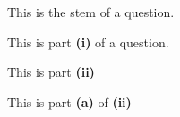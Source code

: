 

\begin{question}
    This is the stem of a question.

    \begin{questionparts}
        \item This is part \textbf{(i)} of a question. 
        \item This is part \textbf{(ii)} 
        \begin{questionsubparts}
            \item This is part \textbf{(a)} of \textbf{(ii)}
        \end{questionsubparts}
    \end{questionparts}

\end{question}



